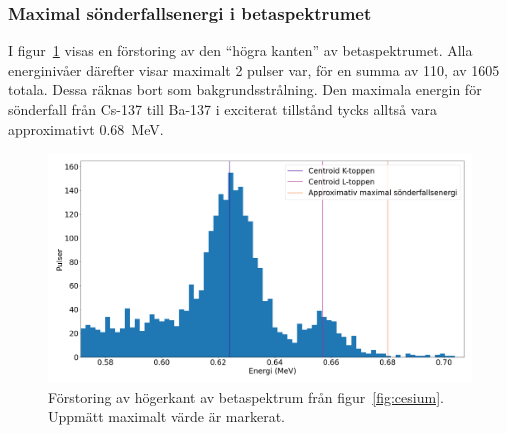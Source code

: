 \subsubsection{Maximal sönderfallsenergi i betaspektrumet} \label{sec:betamax}

I figur~\ref{fig:cesiummax} visas en förstoring av den ``högra kanten'' av
betaspektrumet. Alla energinivåer därefter visar maximalt \num{2} pulser var,
för en summa av 110, av \num{1605} totala. Dessa räknas bort som
bakgrundsstrålning. Den maximala energin för sönderfall från Cs-137 till Ba-137
i exciterat tillstånd tycks alltså vara approximativt \qty{0.68}{\MeV}.

\begin{figure}[!ht]
    \centering
    \includegraphics[width=\textwidth, keepaspectratio]{../images/cesium_max.png}
    \caption{
        Förstoring av högerkant av betaspektrum från figur~\ref{fig:cesium}.
        Uppmätt maximalt värde är markerat.
    }
    \label{fig:cesiummax}
\end{figure}
